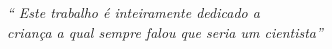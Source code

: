 \begin{epigrafe}
	\vspace*{\fill}
	\begin{flushright}
		\textit{``
		Este trabalho é inteiramente dedicado a 
		\\ criança a qual sempre falou que seria um cientista''}
	\end{flushright}
\end{epigrafe}
